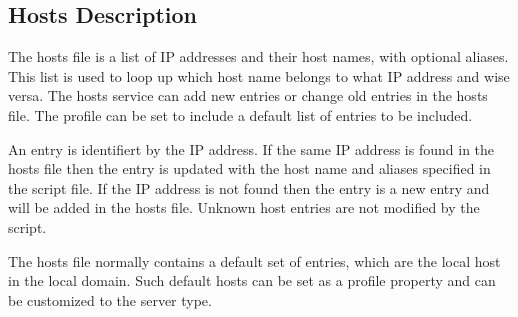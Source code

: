 \subsection{Hosts Description}

The hosts file is a list of IP addresses and their host names, with optional
aliases. This list is used to loop up which host name belongs to what 
IP address and wise versa. The hosts service can add new entries or change
old entries in the hosts file. The profile can be set to include a default
list of entries to be included.

An entry is identifiert by the IP address. If the same IP address is found
in the hosts file then the entry is updated with the host name and aliases
specified in the script file. If the IP address is not found then the 
entry is a new entry and will be added in the hosts file. Unknown host entries
are not modified by the script.

The hosts file normally contains a default set of entries, which are the local
host in the local domain. Such default hosts can be set as a profile property
and can be customized to the server type.
